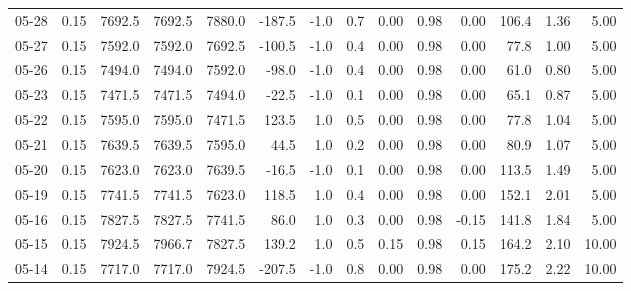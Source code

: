 \begin{threeparttable}
{\begin{tabular}{lrrrrrrrrrrrrr}
  05-28 &     0.15 & 7692.5 & 7692.5 & 7880.0 &     -187.5 &                     -1.0 &                 0.7 &       0.00 &      0.98 &           0.00 &            106.4 &            1.36 &                   5.00 \\
  05-27 &     0.15 & 7592.0 & 7592.0 & 7692.5 &     -100.5 &                     -1.0 &                 0.4 &       0.00 &      0.98 &           0.00 &             77.8 &            1.00 &                   5.00 \\
  05-26 &     0.15 & 7494.0 & 7494.0 & 7592.0 &      -98.0 &                     -1.0 &                 0.4 &       0.00 &      0.98 &           0.00 &             61.0 &            0.80 &                   5.00 \\
  05-23 &     0.15 & 7471.5 & 7471.5 & 7494.0 &      -22.5 &                     -1.0 &                 0.1 &       0.00 &      0.98 &           0.00 &             65.1 &            0.87 &                   5.00 \\
  05-22 &     0.15 & 7595.0 & 7595.0 & 7471.5 &      123.5 &                      1.0 &                 0.5 &       0.00 &      0.98 &           0.00 &             77.8 &            1.04 &                   5.00 \\
  05-21 &     0.15 & 7639.5 & 7639.5 & 7595.0 &       44.5 &                      1.0 &                 0.2 &       0.00 &      0.98 &           0.00 &             80.9 &            1.07 &                   5.00 \\
  05-20 &     0.15 & 7623.0 & 7623.0 & 7639.5 &      -16.5 &                     -1.0 &                 0.1 &       0.00 &      0.98 &           0.00 &            113.5 &            1.49 &                   5.00 \\
  05-19 &     0.15 & 7741.5 & 7741.5 & 7623.0 &      118.5 &                      1.0 &                 0.4 &       0.00 &      0.98 &           0.00 &            152.1 &            2.01 &                   5.00 \\
  05-16 &     0.15 & 7827.5 & 7827.5 & 7741.5 &       86.0 &                      1.0 &                 0.3 &       0.00 &      0.98 &          -0.15 &            141.8 &            1.84 &                   5.00 \\
  05-15 &     0.15 & 7924.5 & 7966.7 & 7827.5 &      139.2 &                      1.0 &                 0.5 &       0.15 &      0.98 &           0.15 &            164.2 &            2.10 &                  10.00 \\
  05-14 &     0.15 & 7717.0 & 7717.0 & 7924.5 &     -207.5 &                     -1.0 &                 0.8 &       0.00 &      0.98 &           0.00 &            175.2 &            2.22 &                  10.00 \\

\end{tabular}}
\end{threeparttable}
